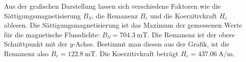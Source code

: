 \noindent Aus der grafischen Darstellung lassen sich verschiedene Faktoren
wie die Sättigungsmagnetisierung $B_{S}$, die Remanenz $B_{r}$ und die
Koerzitivkraft $H_{c}$ ablesen.
Die Sättigungsmagnetisierung ist das Maximum der gemessenen Werte für
die magnetische Flussdichte: $B_{S} = \SI{704.3}{\milli\tesla}$.
Die Remanenz ist der obere Schnittpunkt mit der $y$-Achse. %
Bestimmt man diesen aus der Grafik, ist die Remanenz also
$B_{r} = \SI{122.8}{\milli\tesla}$.
Die Koerzitivkraft beträgt 
$H_{c} = \SI{437.06}{\ampere\per\meter}$. %

